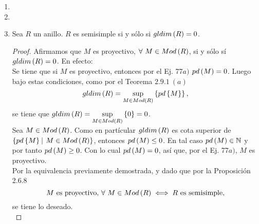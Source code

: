 \documentclass{article}
\begin{document}
\begin{enumerate}[label=\textbf{Ej \arabic*.}]
\begin{proof}
\begin{align*}
				&=re_i. && \fntfam{e}{j}{n}\text{ es una f. i. o.}
			\end{align*}
			Más aún, así se tiene que $\sum\limits_{i=1}^nRe_i\subseteq Re$. Notemos que $re=\sum\limits_{i=1}^nre_i\in\sum\limits_{i=1}^nRe_i$, así para verificar que $Re=\bigoplus\limits_{i=1}^nRe_i$ basta con verificar que esta descomposición es única. Sea $s\in R$ tal que $re=\sum\limits_{i=1}^n se_i$, entonces
			\begin{align*}
				\sum\limits_{i=1}^n re_i&=\sum\limits_{i=1}^n se_i\\
				\implies \sum\limits_{i=1}^n \lrprth{r-s}e_i&=0.\\
				\intertext{Sea $j\in[1,n]$. Multiplicando a ambos lados de la igualdad por $e_j$ y empleando nuevamente que $\fntfam{e}{j}{n}$ es una f. i. o. se obtiene que}
				\lrprth{r-s}e_j&=0,\ \forall\ j\in[1,n]\\
				\implies re_j&=se_j ,\ \forall\ j\in[1,n]
			\end{align*}
			y así se tiene lo deseado.\\
		\end{proof}
		\item 
		\item
		\item Sea $R$ un anillo. $R$ es semisimple si y sólo si $gldim\left(R\right)=0$.
		\begin{proof}
			Afirmamos que $M$ es proyectivo, $\forall\ M\in Mod\left(R\right)$, si y sólo sí $gldim\left(R\right)=0$. En efecto:\\
			\boxed{\implies} Se tiene que si $M$ es proyectivo, entonces por el Ej. 77$a)$ $pd\left(M\right)=0$. Luego bajo estas condiciones, como por el Teorema $2.9.1\ (a)$ \begin{equation*}
				gldim\left(R\right)=\sup\limits_{M\in Mod\left(R\right)}\left\{pd\left\{M\right\}\right\},
			\end{equation*} se tiene que $gldim\left(R\right)=\sup\limits_{M\in Mod\left(R\right)}\left\{0\right\}=0$.\\
			\boxed{\impliedby} Sea $M\in Mod\left(R\right)$. Como en partícular $gldim\left(R\right)$ es cota superior de $\lrbrack{pd\lrbrack{M}\ \vline\ M\in Mod\lrprth{R}}$, entonces $pd\left(M\right)\leq 0$. En tal caso $pd\left(M\right)\in\mathbb{N}$ y por tanto $pd\left(M\right)\geq 0$. Con lo cual $pd\left(M\right)=0$, así que, por el Ej. 77$a)$, $M$ es proyectivo.\\
			Por la equivalencia previamente demostrada, y dado que por la Proposición 2.6.8 \begin{equation*}
				 M \text{ es proyectivo, }\forall\ M\in Mod\left(R\right) \iff R\text{ es semisimple,}
			\end{equation*}se tiene lo deseado.\\
		\end{proof}

	\end{enumerate}
\end{document}
